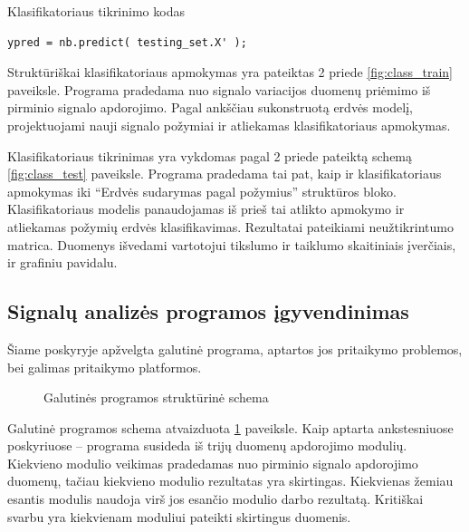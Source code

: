 \documentclass[]{vgtuef}
\begin{document}
\begin{cfigure}
	\centering
	\caption{Klasifikatoriaus tikrinimo kodas}
	\label{code:nb_testing}
	\begin{lstlisting}
ypred = nb.predict( testing_set.X' );
  \end{lstlisting}
\end{cfigure}

Struktūriškai klasifikatoriaus apmokymas yra pateiktas 2 priede \ref{fig:class_train} paveiksle. Programa pradedama nuo signalo variacijos duomenų priėmimo iš pirminio signalo apdorojimo. Pagal ankščiau sukonstruotą erdvės modelį, projektuojami nauji signalo požymiai ir atliekamas klasifikatoriaus apmokymas.

Klasifikatoriaus tikrinimas yra vykdomas pagal 2 priede pateiktą schemą \ref{fig:class_test} paveiksle. Programa pradedama tai pat, kaip ir klasifikatoriaus apmokymas iki ``Erdvės sudarymas pagal požymius'' struktūros bloko. Klasifikatoriaus modelis panaudojamas iš prieš tai atlikto apmokymo ir atliekamas požymių erdvės klasifikavimas. Rezultatai pateikiami neužtikrintumo matrica. Duomenys išvedami vartotojui tikslumo ir taiklumo skaitiniais įverčiais, ir grafiniu pavidalu.

\subsection{Signalų analizės programos įgyvendinimas}
\label{subsec:total_program}

Šiame poskyryje apžvelgta galutinė programa, aptartos jos pritaikymo problemos, bei galimas pritaikymo platformos.

\begin{figure}
  \centering
  
  \caption{Galutinės programos struktūrinė schema}
  \label{fig:galutine_programa}
\end{figure}

Galutinė programos schema atvaizduota \ref{fig:galutine_programa} paveiksle. Kaip aptarta ankstesniuose poskyriuose -- programa susideda iš trijų duomenų apdorojimo modulių. Kiekvieno modulio veikimas pradedamas nuo pirminio signalo apdorojimo duomenų, tačiau kiekvieno modulio rezultatas yra skirtingas. Kiekvienas žemiau esantis modulis naudoja virš jos esančio modulio darbo rezultatą. Kritiškai svarbu yra kiekvienam moduliui pateikti skirtingus duomenis.
\end{document}
